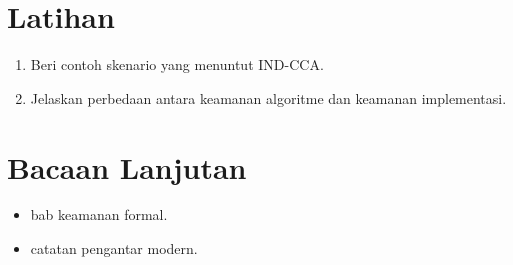 \documentclass[../main.tex]{subfiles}
\begin{document}
\section{Latihan}
\begin{enumerate}
  \item Beri contoh skenario yang menuntut IND-CCA.
  \item Jelaskan perbedaan antara keamanan algoritme dan keamanan implementasi.
\end{enumerate}

\section{Bacaan Lanjutan}
\begin{itemize}
  \item \citep{bonehshoup} bab keamanan formal.
  \item \citep{bellare_rogaway_notes} catatan pengantar modern.
\end{itemize}
\end{document}
